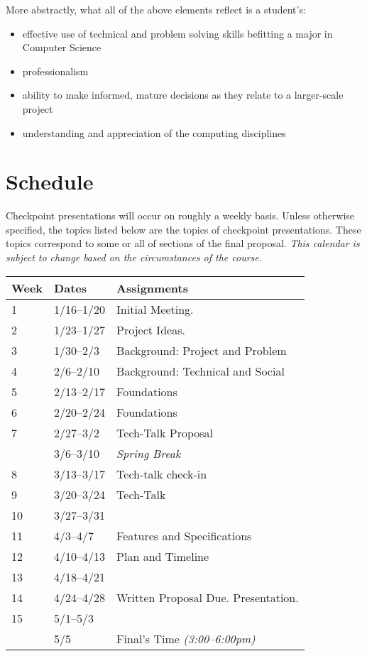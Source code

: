 \documentclass[10pt]{article}
\begin{document}
More abstractly, what all of the above elements reflect is a student's:
\begin{itemize}
\item effective use of technical and problem solving skills befitting a major in Computer Science
\item professionalism
\item ability to make informed, mature decisions as they relate to a larger-scale project
\item understanding and appreciation of the computing disciplines
\end{itemize}


\section{Schedule}

Checkpoint presentations will occur on roughly a weekly basis. Unless otherwise specified, the topics listed below are the topics of checkpoint presentations. These topics correspond to some or all of sections of the final proposal. \textit{This calendar is subject to change based on the circumstances of the course.}

\begin{center}
\begin{tabular}{lll}
Week & Dates & Assignments \\ \toprule
1 & 1/16--1/20 &  Initial Meeting.  \\
2 & 1/23--1/27 & Project Ideas. \\
3 & 1/30--2/3 & Background: Project and Problem \\
4 & 2/6--2/10 & Background: Technical and Social \\
5 & 2/13--2/17 & Foundations \\
6 & 2/20--2/24 & Foundations  \\
7 & 2/27--3/2 & Tech-Talk Proposal \\
 & 3/6--3/10 & \textit{Spring Break} \\
8 & 3/13--3/17  & Tech-talk check-in \\
9 & 3/20--3/24 & Tech-Talk   \\
10 & 3/27--3/31 &  \\
11 & 4/3--4/7 &  Features and Specifications\\
12 & 4/10--4/13 & Plan and Timeline  \\
13 & 4/18--4/21 & \\
14 & 4/24--4/28 & Written Proposal Due. Presentation. \\
15 & 5/1--5/3 &   \\ \midrule
  & 5/5 & Final's Time \textit{(3:00--6:00pm)}  \\
\end{tabular}
\end{center}
\end{document}
